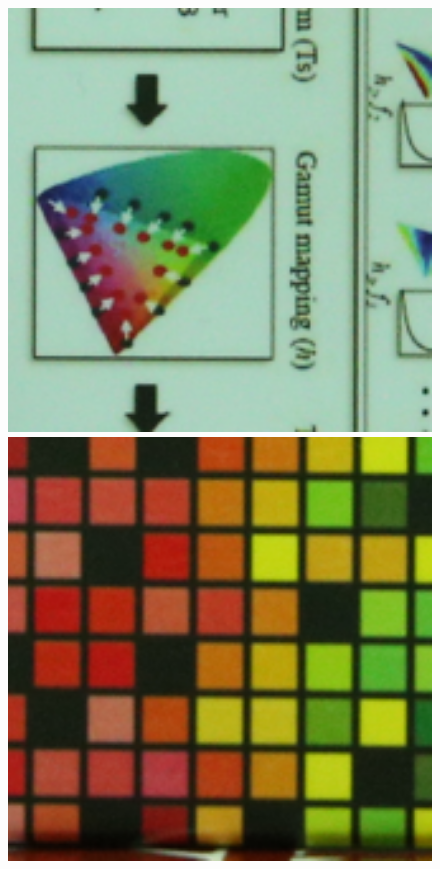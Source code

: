 \documentclass[10pt,twocolumn,letterpaper]{article}
\begin{document}
\begin{figure}[t]
{\begin{minipage}{0.055\textwidth}
\end{minipage}
\begin{minipage}{0.055\textwidth}
\includegraphics[width=1\textwidth]{images/resize_CC_Noisy_Canon_EOS_5D_Mark3_ISO_3200_C2_44.png}
\end{minipage}
\begin{minipage}{0.055\textwidth}
\includegraphics[width=1\textwidth]{images/resize_CC_Noisy_Canon_EOS_5D_Mark3_ISO_3200_C2_66.png}

\end{minipage}}
\end{figure}
\end{document}
